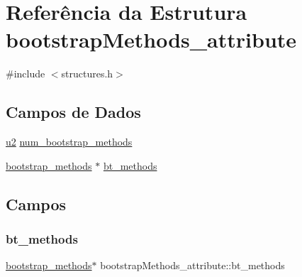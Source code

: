 \hypertarget{structbootstrapMethods__attribute}{}\section{Referência da Estrutura bootstrap\+Methods\+\_\+attribute}
\label{structbootstrapMethods__attribute}


{\ttfamily \#include $<$structures.\+h$>$}

\subsection*{Campos de Dados}
\begin{DoxyCompactItemize}
\item 
\hyperlink{lista__operandos_8h_a732cde1300aafb73b0ea6c2558a7a54f}{u2} \hyperlink{structbootstrapMethods__attribute_aad5dc2c56be879fe48451587b71c6715}{num\+\_\+bootstrap\+\_\+methods}
\item 
\hyperlink{structbootstrap__methods}{bootstrap\+\_\+methods} $\ast$ \hyperlink{structbootstrapMethods__attribute_a602dcc74faa430494a9c300edf2a74c3}{bt\+\_\+methods}
\end{DoxyCompactItemize}


\subsection{Campos}
\mbox{\label{structbootstrapMethods__attribute_a602dcc74faa430494a9c300edf2a74c3}} 
\subsubsection{\texorpdfstring{bt\+\_\+methods}{bt\_methods}}
{\footnotesize\ttfamily \hyperlink{structbootstrap__methods}{bootstrap\+\_\+methods}$\ast$ bootstrap\+Methods\+\_\+attribute\+::bt\+\_\+methods}

\mbox{\label{structbootstrapMethods__attribute_aad5dc2c56be879fe48451587b71c6715}} 
